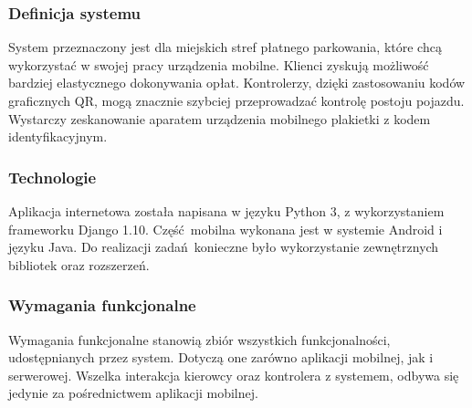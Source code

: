\subsubsection*{Definicja systemu}

System przeznaczony jest dla miejskich stref płatnego parkowania, które chcą wykorzystać w swojej pracy urządzenia mobilne. Klienci zyskują możliwość bardziej elastycznego dokonywania opłat. Kontrolerzy, dzięki zastosowaniu kodów graficznych QR, mogą znacznie szybciej przeprowadzać kontrolę postoju pojazdu. Wystarczy zeskanowanie aparatem urządzenia mobilnego plakietki z kodem identyfikacyjnym. 

\subsubsection*{Technologie}

Aplikacja internetowa została napisana w języku Python 3, z wykorzystaniem frameworku Django 1.10. Część mobilna wykonana jest w systemie Android i języku Java. Do realizacji zadań konieczne było wykorzystanie zewnętrznych bibliotek oraz rozszerzeń.

\subsubsection*{Wymagania funkcjonalne}

Wymagania funkcjonalne stanowią zbiór wszystkich funkcjonalności, udostępnianych przez system. Dotyczą one zarówno aplikacji mobilnej, jak i serwerowej. Wszelka interakcja kierowcy oraz kontrolera z systemem, odbywa się jedynie za pośrednictwem aplikacji mobilnej.

